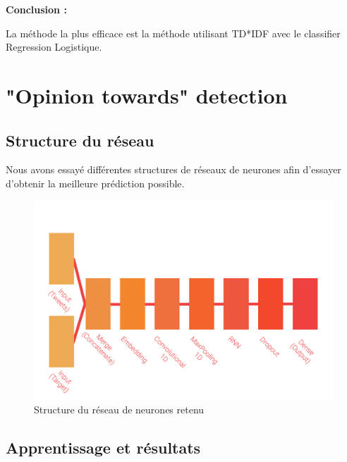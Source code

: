\par \textbf{Conclusion :} \\
\par La méthode la plus efficace est la méthode utilisant TD*IDF avec le classifier Regression Logistique. \\


 
\section{"Opinion towards" detection}

\par 

\subsection{Structure du réseau}

\par Nous avons essayé différentes structures de réseaux de neurones afin d'essayer d'obtenir la meilleure prédiction possible.

\par %

\begin{figure}
	\centering
	\includegraphics[scale=1.5]{./img/nn.png}
	\caption{Structure du réseau de neurones retenu}
	\label{fig:nn}
\end{figure}

\par %


\subsection{Apprentissage et résultats}

